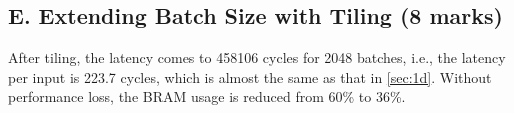 \subsection{E. Extending Batch Size with Tiling (8 marks)}\label{sec:1e}

After tiling, the latency comes to 458106 cycles for 2048 batches, i.e., the latency per input is 223.7 cycles, which is almost the same as that in \autoref{sec:1d}.
Without performance loss, the BRAM usage is reduced from 60\% to 36\%.

